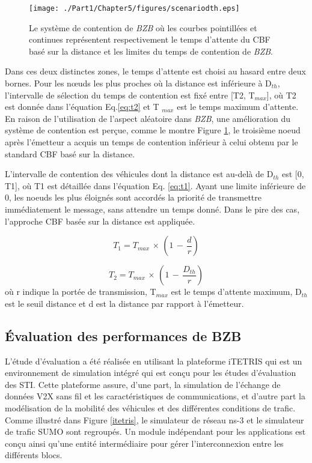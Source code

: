 \begin{figure}[!t]
\centering
\texttt{[image: ./Part1/Chapter5/figures/scenariodth.eps]}
\caption{Le système de contention de \textit{BZB} où  les courbes pointillées et continues représentent respectivement le temps d'attente du CBF basé sur la distance et les limites du temps de contention de \textit{BZB}.}
\label{BZB}
\end{figure}

Dans ces deux distinctes zones, le temps d'attente est choisi au hasard entre deux bornes. Pour les nœuds les plus proches où la distance est inférieure à D$_{th}$, l'intervalle de sélection du temps de contention est fixé entre [T2, T$_{max}$], où T2 est donnée dans l'équation Eq.\ref{eq:t2} et T $_{max}$ est le temps maximum d'attente. En raison de l'utilisation de l'aspect aléatoire dans \textit{BZB}, une amélioration du système de contention est perçue, comme le montre Figure \ref{BZB}, le troisième noeud après l'émetteur a acquis un temps de contention inférieur à celui obtenu par le standard CBF basé sur la distance.

L'intervalle de contention des véhicules dont la distance est au-delà de D$_{th}$ est [0, T1], où T1 est détaillée dans l'équation Eq. \ref{eq:t1}. Ayant une limite inférieure de 0, les noeuds les plus éloignés sont accordés la priorité de transmettre immédiatement le message, sans attendre un temps donné. Dans le pire des cas, l'approche CBF basée sur la distance est appliquée.

\begin{equation}
T_{1} = T_{max}\,\times\,(1\,-\,\frac{d}{r})\label{eq:t1}\end{equation}

\begin{equation}
T_{2} = T_{max}\,\times\,(1\,-\,\frac{D_{th}}{r})\label{eq:t2}\end{equation}
où r indique la portée de transmission, T$_{max}$ est le temps d'attente maximum, D$_{th}$ est le seuil distance et d est la distance par rapport à l'émetteur.

\subsection{Évaluation des performances de BZB}

L'étude d'évaluation a été réalisée en utilisant la plateforme iTETRIS qui est un environnement de simulation intégré qui est conçu pour les études d'évaluation des STI. Cette plateforme assure, d'une part, la simulation de l'échange de données V2X sans fil et les caractéristiques de communications, et d'autre part la modélisation de la mobilité des véhicules et des différentes conditions de trafic. Comme illustré dans Figure \ref{itetris}, le simulateur de réseau ns-3 \cite{ns3} et le simulateur de trafic SUMO \cite{sumo} sont regroupés. Un module indépendant pour les applications est conçu ainsi qu'une entité intermédiaire pour gérer l'interconnexion entre les différents blocs.

